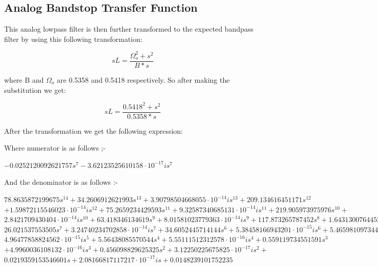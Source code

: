 \documentclass{scrartcl}
\begin{document}
\subsection{Analog Bandstop Transfer Function}

This analog lowpass filter is then further transformed to the expected bandpass filter by using this following transformation:

$$sL = \frac{\Omega_{o}^2 + s^2}{B*s}$$

where B and $\Omega_{o}$ are 0.5358 and  0.5418 respectively. So after making the substitution we get:

\begin{equation}
    sL = \frac{0.5418^2 + s^2}{0.5358*s}
\end{equation}

After the transformation we get the following expression:

Where numerator is as follows ;-

\begin{center}

$- 0.0252120092621757 s^{7} - 3.62123525610158 \cdot 10^{-17} i s^{7}$

\end{center}

And the denominator is as follows :-

\begin{center}

$    78.8635872199675 s^{14} + 34.2606912621993 s^{13} + 3.90798504668055 \cdot 10^{-14} i s^{13} + 209.134616451171 s^{12} $
$+ 1.59872115546023 \cdot 10^{-14} i s^{12} + 75.2659234429593 s^{11} + 9.32587340685131 \cdot 10^{-14} i s^{11} + 219.905973975976 s^{10} + $\\
$2.8421709430404 \cdot 10^{-14} i s^{10} + 63.418346134619 s^{9} + 8.01581023779363 \cdot 10^{-14} i s^{9} + 117.873265787452 s^{8} + 1.64313007644523 \cdot 10^{-14} i s^{8} +$\\
$26.021537553505 s^{7} + 3.24740234702858 \cdot 10^{-14} i s^{7} + 34.6052445714144 s^{6} + 5.38458166943201 \cdot 10^{-15} i s^{6} + 5.46598109734443 s^{5} + $\\
$4.96477858824562 \cdot 10^{-15} i s^{5} + 5.56438085570544 s^{4} + 5.55111512312578 \cdot 10^{-16} i s^{4} + 0.559119734551591 s^{3}$\\
$+ 4.9960036108132 \cdot 10^{-16} i s^{3} + 0.456098829625325 s^{2} + 3.12250225675825 \cdot 10^{-17} i s^{2} + $\\
$0.0219359153546601 s + 2.08166817117217 \cdot 10^{-17} i s + 0.0148239101752235$
    
\end{center}
\end{document}

